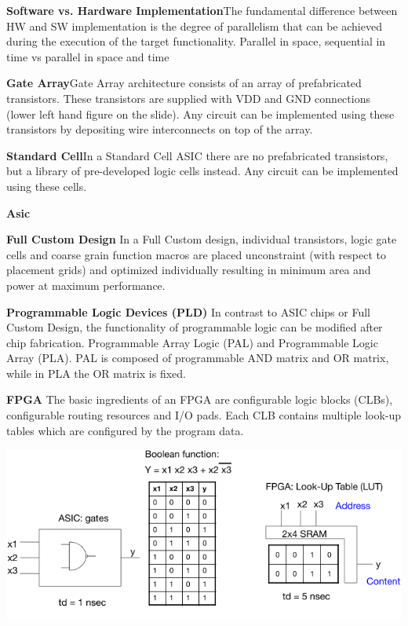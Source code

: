 \documentclass[english]{latex4ei/latex4ei_sheet}
\begin{document}
\textbf{Software vs. Hardware Implementation}The fundamental difference between HW and SW implementation is the degree of parallelism that can be achieved during the execution of the target functionality. Parallel in space, sequential in time vs parallel in space and time

\textbf{Gate Array}Gate Array architecture consists of an array of prefabricated transistors. These transistors are supplied with VDD and GND connections (lower left hand figure on the slide). Any circuit can be implemented using these transistors by depositing wire interconnects on top of the array.

\textbf{Standard Cell}In a Standard Cell ASIC there are no prefabricated transistors, but a library of pre-developed logic cells instead. Any circuit can be implemented using these cells.

\textbf{Asic}

\textbf{Full Custom Design}
In a Full Custom design, individual transistors, logic gate cells and coarse grain function macros are placed unconstraint (with respect to placement grids) and optimized individually resulting in minimum area and power at maximum performance.

\textbf{Programmable Logic Devices (PLD)}
In contrast to ASIC chips or Full Custom Design, the functionality of programmable logic can be modified after chip fabrication.
Programmable Array Logic (PAL) and Programmable Logic Array (PLA). PAL is composed of programmable AND matrix and OR matrix, while in PLA the OR matrix is fixed.

\textbf{FPGA}
The basic ingredients of an FPGA are configurable logic blocks (CLBs), configurable routing resources and I/O pads. Each CLB contains multiple look-up tables which are configured by the program data.

\begin{center}
  \includegraphics[width=\linewidth]{assets/FPGARealization.png}
  \label{fig:fpgarealization}
\end{center}
\end{document}
